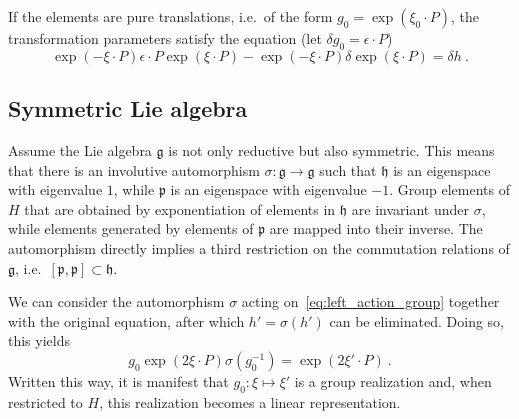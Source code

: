 \documentclass[11pt]{article}
\begin{document}
If the elements are pure translations, i.e.~of the form $g_0 = 
\exp(\xi_0\cdot P)$, the transformation parameters satisfy the 
equation (let $\delta g_0 = \epsilon\cdot P$)
\begin{equation}\label{eq:nonlin_trafo_inf}
	\exp(-\xi\cdot P) \epsilon\cdot P \exp(\xi\cdot P) - 
	\exp(-\xi\cdot P) \delta\exp(\xi\cdot P) = \delta h~.
\end{equation}


\subsection{Symmetric Lie algebra}

Assume the Lie algebra $\mathfrak{g}$ is not only reductive but 
also symmetric. This means that there is an involutive 
automorphism $\sigma : \mathfrak{g} \to \mathfrak{g}$ such that 
$\mathfrak{h}$ is an eigenspace with eigenvalue $1$, while 
$\mathfrak{p}$ is an eigenspace with eigenvalue $-1$. Group 
elements of $H$ that are obtained by exponentiation of elements 
in $\mathfrak{h}$ are invariant under $\sigma$, while elements 
generated by elements of $\mathfrak{p}$ are mapped into their 
inverse. The automorphism directly implies a third restriction on 
the commutation relations of $\mathfrak{g}$, 
i.e.~$[\mathfrak{p},\mathfrak{p}] \subset \mathfrak{h}$.

We can consider the automorphism $\sigma$ acting 
on~\eqref{eq:left_action_group} together with the original 
equation, after which $h' = \sigma(h')$ can be eliminated. Doing 
so, this yields
%
\begin{equation}
	g_0 \exp(2\xi\cdot P) \sigma(g_0^{-1}) = \exp(2\xi'\cdot P)~.
\end{equation}
Written this way, it is manifest that $g_0 : \xi \mapsto \xi'$ is 
a group realization and, when restricted to $H$, this realization 
becomes a linear representation.
\end{document}

